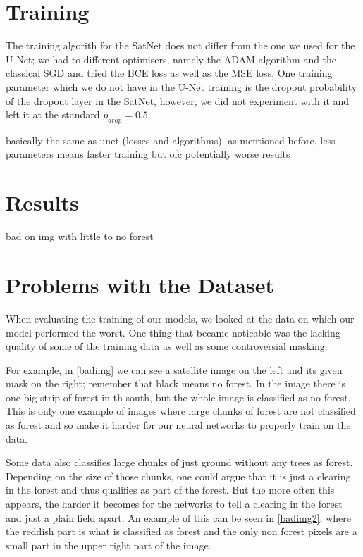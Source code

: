 \section{Training}
The training algorith for the SatNet does not differ from the one we used for the U-Net; we had to different optimisers, namely the ADAM algorithm and the classical SGD and tried the BCE loss as well as the MSE loss. One training parameter which we do not have in the U-Net training is the dropout probability of the dropout layer in the SatNet, however, we did not experiment with it and left it at the standard $p_{drop}=0.5$.

basically the same as unet (losses and algorithms). as mentioned before, less parameters means faster training but ofc potentially worse results\\
\section{Results}
bad on img with little to no forest\\
\section{Problems with the Dataset}
When evaluating the training of our models, we looked at the data on which our model performed the worst. One thing that became noticable was the lacking quality of some of the training data as well as some controversial masking.

For example, in \ref{badimg} we can see a satellite image on the left and its given mask on the right; remember that black means no forest. In the image there is one big strip of forest in th south, but the whole image is classified as no forest. This is only one example of images where large chunks of forest are not classified as forest and so make it harder for our neural networks to properly train on the data.

Some data also classifies large chunks of just ground without any trees as forest. Depending on the size of those chunks, one could argue that it is just a clearing in the forest and thus qualifies as part of the forest. But the more often this appears, the harder it becomes for the networks to tell a clearing in the forest and just a plain field apart. An example of this can be seen in \ref{badimg2}, where the reddish part is what is classified as forest and the only non forest pixels are a small part in the upper right part of the image.

